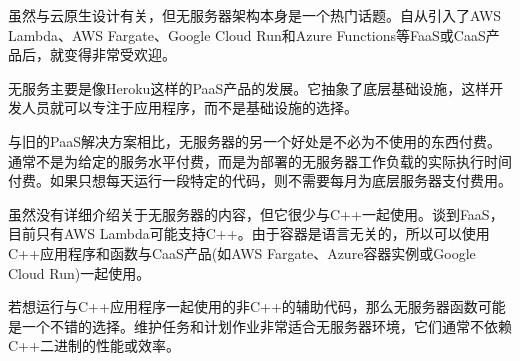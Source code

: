虽然与云原生设计有关，但无服务器架构本身是一个热门话题。自从引入了AWS Lambda、AWS Fargate、Google Cloud Run和Azure Functions等FaaS或CaaS产品后，就变得非常受欢迎。

无服务主要是像Heroku这样的PaaS产品的发展。它抽象了底层基础设施，这样开发人员就可以专注于应用程序，而不是基础设施的选择。

与旧的PaaS解决方案相比，无服务器的另一个好处是不必为不使用的东西付费。通常不是为给定的服务水平付费，而是为部署的无服务器工作负载的实际执行时间付费。如果只想每天运行一段特定的代码，则不需要每月为底层服务器支付费用。

虽然没有详细介绍关于无服务器的内容，但它很少与C++一起使用。谈到FaaS，目前只有AWS Lambda可能支持C++。由于容器是语言无关的，所以可以使用C++应用程序和函数与CaaS产品(如AWS Fargate、Azure容器实例或Google Cloud Run)一起使用。

若想运行与C++应用程序一起使用的非C++的辅助代码，那么无服务器函数可能是一个不错的选择。维护任务和计划作业非常适合无服务器环境，它们通常不依赖C++二进制的性能或效率。



